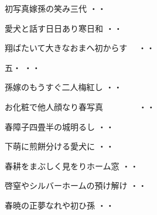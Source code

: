 \vspace{0.6cm}
\begin{shiika}初写真嫁孫の笑み三代
\hfill{・・}\end{shiika}
\vspace{0.6cm}
\begin{shiika}愛犬と話す日日あり寒日和
\hfill{・・}\end{shiika}
\vspace{0.6cm}
\begin{shiika}翔ばたいて大きなおまへ初からす　
\hfill{・・}\end{shiika}
\vspace{0.6cm}
\begin{shiika}五・
\hfill{・・}\end{shiika}
\vspace{0.6cm}
\begin{shiika}孫嫁のもうすぐ二人梅紅し
\hfill{・・}\end{shiika}
\vspace{0.6cm}
\begin{shiika}お化粧で他人顔なり春写真　　　　
\hfill{・・}\end{shiika}
\vspace{0.6cm}
\begin{shiika}春障子四畳半の城明るし
\hfill{・・}\end{shiika}
\vspace{0.6cm}
\begin{shiika}下萌に煎餅分ける愛犬に
\hfill{・・}\end{shiika}
\vspace{0.6cm}
\begin{shiika}春耕をまぶしく見をりホーム窓
\hfill{・・}\end{shiika}
\vspace{0.6cm}
\begin{shiika}啓窒やシルバーホームの預け解け
\hfill{・・}\end{shiika}
\vspace{0.6cm}
\begin{shiika}春暁の正夢なれや初ひ孫
\hfill{・・}\end{shiika}
\vspace{0.6cm}
